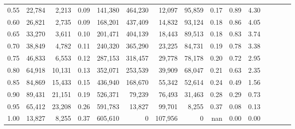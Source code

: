 \begin{tabular}{rrrcrrrrrrrrrrr}
0.55 &  22,784 &   2,213 &                                       0.09 &  141,380 &  464,230 &   12,097 &   95,859 &  0.17 &  0.89 &                         4.30 \\
0.60 &  26,821 &   2,735 &                                       0.09 &  168,201 &  437,409 &   14,832 &   93,124 &  0.18 &  0.86 &                         4.05 \\
0.65 &  33,270 &   3,611 &                                       0.10 &  201,471 &  404,139 &   18,443 &   89,513 &  0.18 &  0.83 &                         3.74 \\
0.70 &  38,849 &   4,782 &                                       0.11 &  240,320 &  365,290 &   23,225 &   84,731 &  0.19 &  0.78 &                         3.38 \\
0.75 &  46,833 &   6,553 &                                       0.12 &  287,153 &  318,457 &   29,778 &   78,178 &  0.20 &  0.72 &                         2.95 \\
0.80 &  64,918 &  10,131 &                                       0.13 &  352,071 &  253,539 &   39,909 &   68,047 &  0.21 &  0.63 &                         2.35 \\
0.85 &  84,869 &  15,433 &                                       0.15 &  436,940 &  168,670 &   55,342 &   52,614 &  0.24 &  0.49 &                         1.56 \\
0.90 &  89,431 &  21,151 &                                       0.19 &  526,371 &   79,239 &   76,493 &   31,463 &  0.28 &  0.29 &                         0.73 \\
0.95 &  65,412 &  23,208 &                                       0.26 &  591,783 &   13,827 &   99,701 &    8,255 &  0.37 &  0.08 &                         0.13 \\
1.00 &  13,827 &   8,255 &                                       0.37 &  605,610 &        0 &  107,956 &        0 &   nan &  0.00 &                         0.00 \\
\bottomrule
\end{tabular}
